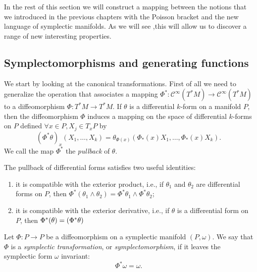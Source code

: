 \documentclass[english,fontsize=11pt,paper=a5,oneside]{scrbook}
\newcommand{\cC}{\mathcal{C}}
\let\d\relax
\newcommand{\d}{\mathrm{d}}
\theoremstyle{definition}
\begin{document}
In the rest of this section we will construct a mapping between the notions that we introduced in the previous chapters with the Poisson bracket and the new language of symplectic manifolds.
As we will see ,this will allow us to discover a range of new interesting properties.

\subsection{Symplectomorphisms and generating functions}

We start by looking at the canonical transformations. First of all we need to generalize the operation that associates a mapping $\Phi^* : \cC^\infty(T^*M) \to \cC^\infty(T^*M)$ to a diffeomorphism $\Phi: T^*M \to T^*M$.
%
If $\theta$ is a differential $k$-form on a manifold $P$, then the diffeomorphism $\Phi$ induces a mapping on the space of differential $k$-forms on $P$ defined $\forall x\in P, X_j\in T_xP$ by
\begin{equation}
  (\Phi^{*}\theta)_{x}(X_{1},\ldots ,X_{k})=\theta_{\Phi(x)}(\Phi_*(x)X_{1},\ldots,\Phi_*(x)X_{k}).
\end{equation}
We call the map $\Phi^*$ the \emph{pullback} of $\theta$.

The pullback of differential forms satisfies two useful identities:
\begin{enumerate}
  \item it is compatible with the exterior product, i.e., if $\theta_1$ and $\theta_2$ are differential forms on $P$, then $\Phi^{*}(\theta_1 \wedge \theta_2) = \Phi^{*}\theta_1 \wedge \Phi^{*}\theta_2$;
  \item it is compatible with the exterior derivative, i.e., if $\theta$ is a differential form on $P$, then $\Phi^{*}(\d\theta) = \d(\Phi^{*}\theta)$
\end{enumerate}

\begin{tcolorbox}
  Let $\Phi: P \to P$ be a diffeomorphism on a symplectic manifold $(P,\omega)$.
  We say that $\Phi$ is a \emph{symplectic transformation}, or \emph{symplectomorphism}, if it leaves the symplectic form $\omega$ invariant:
  \begin{equation}\label{eq:symplectomorphism}
    \Phi^* \omega = \omega.
  \end{equation}
\end{tcolorbox}
\end{document}
